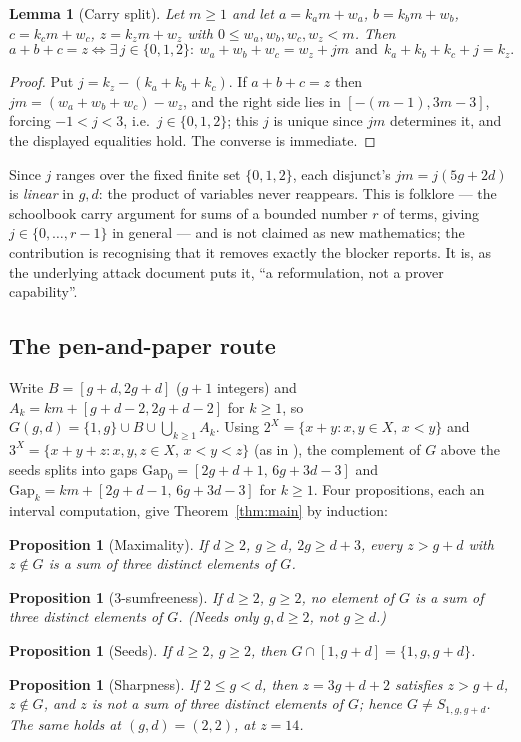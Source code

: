 \documentclass[10pt,reqno]{amsart}
\theoremstyle{plain}
\newtheorem{lemma}[theorem]{Lemma}
\newtheorem{proposition}[theorem]{Proposition}
\theoremstyle{definition}
\theoremstyle{remark}
\numberwithin{theorem}{section}
\newcommand{\G}{G}
\begin{document}
\begin{lemma}[Carry split]
\label{lem:carry}
Let $m\ge1$ and let $a=k_am+w_a$, $b=k_bm+w_b$, $c=k_cm+w_c$, $z=k_zm+w_z$ with
$0\le w_a,w_b,w_c,w_z<m$. Then
\[
a+b+c=z \iff \exists\, j\in\{0,1,2\}:\ w_a+w_b+w_c = w_z + jm\ \ \text{and}\ \
k_a+k_b+k_c+j = k_z .
\]
\end{lemma}
\begin{proof}
Put $j=k_z-(k_a+k_b+k_c)$. If $a+b+c=z$ then $jm=(w_a+w_b+w_c)-w_z$, and the right side lies
in $[-(m-1),3m-3]$, forcing $-1<j<3$, i.e.\ $j\in\{0,1,2\}$; this $j$ is unique since $jm$
determines it, and the displayed equalities hold. The converse is immediate.
\end{proof}

Since $j$ ranges over the fixed finite set $\{0,1,2\}$, each disjunct's $jm=j(5g+2d)$ is
\emph{linear} in $g,d$: the product of variables never reappears. This is folklore --- the
schoolbook carry argument for sums of a bounded number $r$ of terms, giving $j\in
\{0,\dots,r-1\}$ in general --- and is not claimed as new mathematics; the contribution is
recognising that it removes exactly the blocker \cite{Fokkink} reports. It is, as the
underlying attack document puts it, ``a reformulation, not a prover capability''.

\subsection*{The pen-and-paper route}
Write $B=[g+d,2g+d]$ ($g+1$ integers) and $A_k=km+[g{+}d{-}2,2g{+}d{-}2]$ for $k\ge1$, so
$\G(g,d)=\{1,g\}\cup B\cup\bigcup_{k\ge1}A_k$. Using $2^X=\{x+y:x,y\in X,\,x<y\}$ and
$3^X=\{x+y+z:x,y,z\in X,\,x<y<z\}$ (as in \cite{Shtrezi}), the complement of $\G$ above the
seeds splits into gaps $\mathrm{Gap}_0=[2g{+}d{+}1,\,6g{+}3d{-}3]$ and
$\mathrm{Gap}_k=km+[2g{+}d{-}1,\,6g{+}3d{-}3]$ for $k\ge1$. Four propositions, each an interval
computation, give Theorem~\ref{thm:main} by induction:

\begin{proposition}[Maximality]
\label{propA}
If $d\ge2$, $g\ge d$, $2g\ge d+3$, every $z>g+d$ with $z\notin\G$ is a sum of three distinct
elements of $\G$.
\end{proposition}
\begin{proposition}[3-sumfreeness]
\label{propB}
If $d\ge2$, $g\ge2$, no element of $\G$ is a sum of three distinct elements of $\G$. (Needs
only $g,d\ge2$, not $g\ge d$.)
\end{proposition}
\begin{proposition}[Seeds]
\label{propC}
If $d\ge2$, $g\ge2$, then $\G\cap[1,g+d]=\{1,g,g+d\}$.
\end{proposition}
\begin{proposition}[Sharpness]
\label{propD}
If $2\le g<d$, then $z=3g+d+2$ satisfies $z>g+d$, $z\notin\G$, and $z$ is not a sum of three
distinct elements of $\G$; hence $\G\ne S_{1,g,g+d}$. The same holds at $(g,d)=(2,2)$, at
$z=14$.
\end{proposition}
\end{document}
